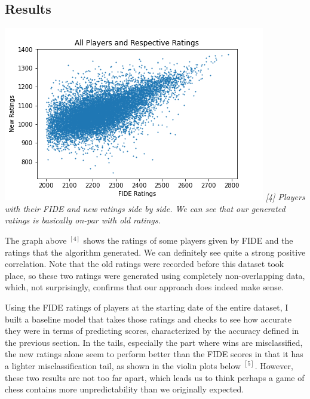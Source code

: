 \documentclass[12pt, letterpaper]{article}
\begin{document}
\begin{multicols}{2}
\section*{Results}

\setlength{\parskip}{0.0cm}
\begin{center}
\begin{scriptsize}

\includegraphics[width=\linewidth]{../figures/two_ratings.png}
\textit{[4] Players with their FIDE and new ratings side by side. We can see that our generated ratings is basically on-par with old ratings. }

\end{scriptsize}
\end{center}
\setlength{\parskip}{0.1cm}

The graph above $^{[4]}$ shows the ratings of some players given by FIDE and the ratings that the algorithm generated. We can definitely see quite a strong positive correlation. Note that the old ratings were recorded before this dataset took place, so these two ratings were generated using completely non-overlapping data, which, not surprisingly, confirms that our approach does indeed make sense.

Using the FIDE ratings of players at the starting date of the entire dataset, I built a baseline model that takes those ratings and checks to see how accurate they were in terms of predicting scores, characterized by the accuracy defined in the previous section. In the tails, especially the part where wins are misclassified, the new ratings alone seem to perform better than the FIDE scores in that it has a lighter misclassification tail, as shown in the violin plots below $^{[5]}$. However, these two results are not too far apart, which leads us to think perhaps a game of chess contains more unpredictability than we originally expected.


\end{multicols}
\end{document}
